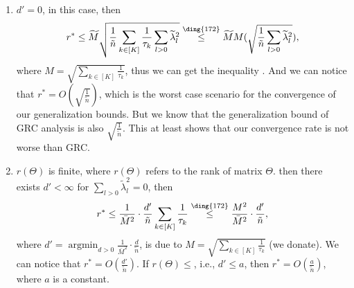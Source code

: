 \documentclass{article}
\def\leqone{\overset{\text{\ding{172}}}{\leq}}
\DeclareMathOperator*{\argmin}{argmin}
\begin{document}
\begin{enumerate}[(1)]
    \item $d' = 0$, in this case, then
    \begin{align*}
        r^* \leq  \widetilde{M} \sqrt{\frac{1}{\tilde{n}} \sum_{k \in [K]} \frac{1}{\tau_k} \sum_{l > 0} \widetilde{\lambda}_l^2 } 
        \leqone  \widetilde{M} M (\sqrt{\frac{1}{\tilde{n}} \sum_{l>0} \widetilde{\lambda}_l^2 }),
    \end{align*}
    where $M = \sqrt{\sum_{k \in [K]} \frac{1}{\tau_k} }$, thus we can get the inequality . And we can notice that $r^* = O(\sqrt{\frac{1}{\tilde{n}}})$, which is the worst case scenario for the convergence of our generalization bounds. But we know that the generalization bound of GRC analysis is also $\sqrt{\frac{1}{\tilde{n}}}$. This at least shows that our convergence rate is not worse than GRC. 

    

    \item $r(\Theta)$ is finite, where $r(\Theta)$ refers to the rank of 
matrix $\Theta$.
    then there exists $ d' < \infty $ for $\sum_{l > 0} \widetilde{\lambda}_l^2 = 0 $, then
    \begin{align*}
        r^* \leq  \frac{1}{\bar{M}^2} \cdot \frac{d'}{\tilde{n}} \sum_{k \in [K]} \frac{1}{\tau_k}
        \leqone  \frac{M^2}{\bar{M}^2} \cdot \frac{d'}{\tilde{n}},
    \end{align*}
where $d' = \argmin_{d>0} \frac{1}{\bar{M}^2} \cdot \frac{d}{\tilde{n}} $,  is due to $M = \sqrt{\sum_{k \in [K]} \frac{1}{\tau_k} }$ (we donate). We can notice that $r^* = O(\frac{d'}{\tilde{n}})$. If $r(\Theta) \leq $, i.e., $d' \leq a$, then $r^* = O(\frac{a}{\tilde{n}})$, where $a$ is a constant. 


\end{enumerate}
\end{document}
